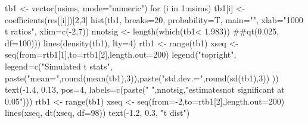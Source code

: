 \begin{Schunk}
\begin{Sinput}
 tb1 <- vector(nsims, mode="numeric")
 for (i in 1:nsims){ tb1[i] <- coefficients(res[[i]])[2,3]}
 hist(tb1, breaks=20, probability=T, main="", xlab="1000 t ratios", xlim=c(-2,7))
 nnotsig <- length(which(tb1< 1.983))  ##qt(0.025, df=100)))
 lines(density(tb1), lty=4)
 rtb1 <- range(tb1)
 xseq <- seq(from=rtb1[1],to=rtb1[2],length.out=200)
 legend("topright", legend=c("Simulated t stats", paste("mean=",round(mean(tb1),3)),paste("std.dev.=",round(sd(tb1),3)) ))
 text(-1.4, 0.13, pos=4, labels=c(paste("    ",nnotsig,"\nsample estimates\n not significant \n at 0.05")))
 rtb1 <- range(tb1)
 xseq <- seq(from=-2,to=rtb1[2],length.out=200)
 lines(xseq, dt(xseq, df=98))
 text(-1.2, 0.3, "t dist")
\end{Sinput}
\end{Schunk}
